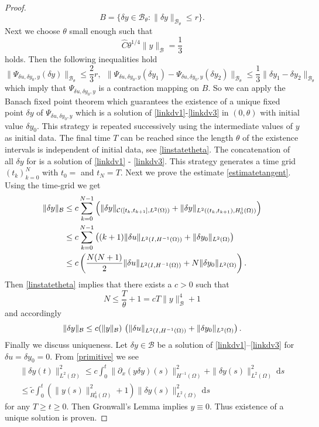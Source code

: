 \begin{proof}
\[
B=\{\delta y \in \mathcal B_{\theta}\colon \|\delta y\|_{\mathcal B_{\theta}}\leq r\}.
\]
{\color{red}
Next we choose $\theta$ small enough such that
\begin{equation}\label{linstatetheta}
\hat C\theta^{1/4}\|y\|_{\mathcal B}=\frac{1}{3}
\end{equation}
holds. Then the following inequalities hold
\[
\|\Psi_{\delta u, \delta y_0,y}(\delta y)\|_{\mathcal B_{\theta}}\leq \frac{2}{3}r,~~\|\Psi_{\delta u, \delta y_0,y}(\delta y_1) - \Psi_{\delta u, \delta y_0,y}(\delta y_2)\|_{\mathcal B_{\theta}}\leq\frac{1}{3}\|\delta y_1-\delta y_2\|_{\mathcal B_{\theta}}
\]
which imply that $\Psi_{\delta u, \delta y_0,y}$ is a contraction mapping on $B$. So we can apply the Banach fixed point theorem which guarantees the existence of a unique fixed point $\delta y$ of $\Psi_{\delta u, \delta y_0,y}$ which is a solution of \eqref{linkdv1}-\eqref{linkdv3} in $(0,\theta)$ with initial value $\delta y_0$. This strategy is repeated successively using the intermediate values of $y$ as initial data. The final time $T$ can be reached since the length $\theta$ of the existence intervals is independent of initial data, see \eqref{linstatetheta}. The concatenation of all $\delta y$ for is a solution of \eqref{linkdv1} - \eqref{linkdv3}. This strategy generates a time grid $(t_k)_{k=0}^N$ with $t_0=$ and $t_N=T$. Next we prove the estimate \eqref{estimatetangent}. Using the time-grid we get
\begin{align*}
\|\delta y\|_{\mathcal B}&\leq c\sum_{k=0}^{N-1}\left(\|\delta y\|_{\mathcal C([t_k,t_{k+1}],L^2(\Omega))}+\|\delta y\|_{L^2((t_k,t_{k+1}),H^1_0(\Omega))}\right)\\
&\leq c\sum_{k=0}^{N-1}\left((k+1)\|\delta u\|_{\Hm1}+\|\delta y_0\|_{L^2(\Omega)}\right)\\
&\leq c\left(\frac{N(N+1)}{2}\|\delta u\|_{\Hm1}+N\|\delta y_0\|_{L^2(\Omega)}\right).
\end{align*}
Then \eqref{linstatetheta} implies that there exists a $c>0$ such that
\[
N\leq\frac T\theta+1=cT\|y\|_{\mathcal B}^4+1
\]
and accordingly
\[
\|\delta y\|_{\mathcal B}\leq c(\|y\|_{\mathcal B})\,\left(\|\delta u\|_{\Hm1}+\|\delta y_0\|_{L^2(\Omega)}\right).
\]
}
{\color{blue}
Finally we discuss uniqueness. Let $\delta y\in \mathcal B$ be a solution of \eqref{linkdv1}--\eqref{linkdv3} for $\delta u=\delta y_0=0$. From \eqref{primitive} we see
\begin{multline*}
\|\delta y(t)\|_{L^2(\Omega)}^2\leq c\int_0^t\|\partial_x(y\delta y)(s)\|_{H^{-1}(\Omega)}^2+\|\delta y(s)\|^2_{L^2(\Omega)}~\mathrm ds\\
\leq \tilde c\int_0^t\left(\|y(s)\|_{H^1_0(\Omega)}^2+1\right)\|\delta y(s)\|_{L^2(\Omega)}^2~\mathrm ds
\end{multline*}
for any $T\geq t\geq 0$. Then Gronwall's Lemma implies $y\equiv0$. Thus existence of a unique solution is proven.}


\end{proof}
